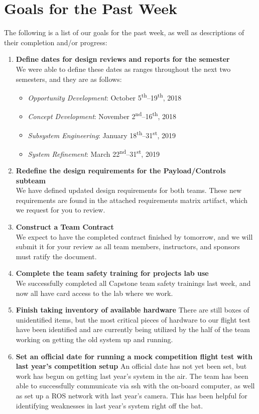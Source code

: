 \documentclass[]{../auvsi_doc}
\newcommand{\ts}[1]{\textsuperscript{#1}}
\begin{document}
\section{Goals for the Past Week}

The following is a list of our goals for the past week, as well as descriptions of their completion and/or progress:

\begin{enumerate}
\item \textbf{Define dates for design reviews and reports for the semester}\\
We were able to define these dates as ranges throughout the next two semesters, and they are as follows:
\begin{itemize}
\item \textit{Opportunity Development}: October 5\ts{th}--19\ts{th}, 2018
\item \textit{Concept Development}: November 2\ts{nd}--16\ts{th}, 2018
\item \textit{Subsystem Engineering}: January 18\ts{th}--31\ts{st}, 2019
\item \textit{System Refinement}: March 22\ts{nd}--31\ts{st}, 2019
\end{itemize}
\item \textbf{Redefine the design requirements for the Payload/Controls subteam}\\
We have defined updated design requirements for both teams. These new requirements are found in the attached requirements matrix artifact, which we request for you to review.
\item \textbf{Construct a Team Contract}\\
We expect to have the completed contract finished by tomorrow, and we will submit it for your review as all team members, instructors, and sponsors must ratify the document.
\item \textbf{Complete the team safety training for projects lab use}\\
We successfully completed all Capstone team safety trainings last week, and now all have card access to the lab where we work.
\item \textbf{Finish taking inventory of available hardware}
There are still boxes of unidentified items, but the most critical pieces of hardware to our flight test have been identified and are currently being utilized by the half of the team working on getting the old system up and running.
\item \textbf{Set an official date for running a mock competition flight test with last year's competition setup}
An official date has not yet been set, but work has begun on getting last year's system in the air. The team has been able to successfully communicate via ssh with the on-board computer, as well as set up a ROS network with last year's camera. This has been helpful for identifying weaknesses in last year's system right off the bat.
\end{enumerate}
\end{document}
